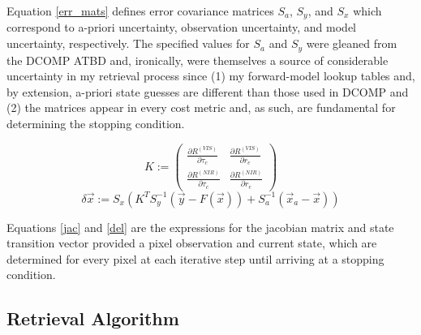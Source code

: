 \documentclass[12pt]{article}
\begin{document}
Equation \ref{err_mats} defines error covariance matrices $S_a$, $S_y$, and $S_x$ which correspond to a-priori uncertainty, observation uncertainty, and model uncertainty, respectively. The specified values for $S_a$ and $S_y$ were gleaned from the DCOMP ATBD and, ironically, were themselves a source of considerable uncertainty in my retrieval process since (1) my forward-model lookup tables and, by extension, a-priori state guesses are different than those used in DCOMP and (2) the matrices appear in every cost metric and, as such, are fundamental for determining the stopping condition.

\begin{equation}\label{jac}
        K := \begin{pmatrix} \frac{\partial R^{(VIS)}}{\partial \tau_c} & \frac{\partial R^{(VIS)}}{\partial r_e} \\ \frac{\partial R^{(NIR)}}{\partial \tau_c} & \frac{\partial R^{(NIR)}}{\partial r_e} \end{pmatrix}
\end{equation}
\begin{equation}\label{del}
        \delta \vec{x} := S_x\left(K^T S_y^{-1} (\vec{y}-F(\vec{x})) + S_a^{-1}(\vec{x}_a-\vec{x})\right)
\end{equation}

Equations \ref{jac} and \ref{del} are the expressions for the jacobian matrix and state transition vector provided a pixel observation and current state, which are determined for every pixel at each iterative step until arriving at a stopping condition.

\subsection{Retrieval Algorithm}
\end{document}
